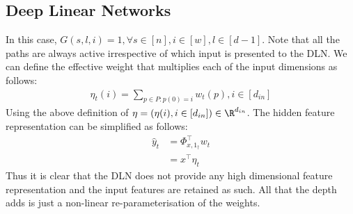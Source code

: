 

\subsection{Deep Linear Networks}
In this case, $G(s,l,i)=1,\forall s\in[n],i\in[w],l\in[d-1]$. Note that all the paths are always active irrespective of which input is presented to the DLN. We can define the effective weight that multiplies each of the input dimensions as follows:
\begin{align}
\eta_{t}(i)= \sum_{p\in P: p(0)=i} w_{t}(p), i\in [d_{in}]
\end{align}
Using the above definition of $\eta=(\eta(i),i\in[d_{in}])\in \R^{d_{in}}$. The hidden feature representation can be simplified as follows:
\begin{align}
\hat{y}_t&=\Phi^\top_{x,1_{\dagger}} w_{t}\\
&=x^\top \eta_{t}
\end{align}
Thus it is clear that the DLN does not provide any high dimensional feature representation and the input features are retained as such. All that the depth adds is just a non-linear re-parameterisation of the weights.

